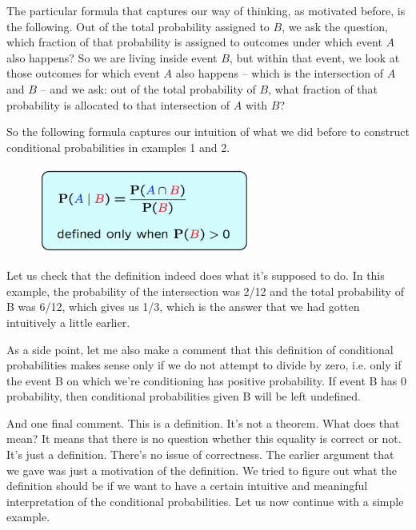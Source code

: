 \documentclass{tufte-handout}
\begin{document}
The particular formula
that captures our way of thinking, as motivated before, is the following. Out of the total probability
assigned to $B$, we ask the question, which fraction of that probability is assigned to
outcomes under which event $A$ also happens? So we are living inside event $B$, but within that event, we
look at those outcomes for which event $A$ also happens -- which is the intersection of $A$ and $B$ -- and we
ask: out of the total probability of $B$, what fraction of that probability is allocated to that intersection of $A$
with $B$?



So the following formula captures our intuition of what we did before to construct conditional
probabilities in examples 1 and 2.\begin{figure}
  \includegraphics[width=7cm]{CondDef}
\end{figure}

 Let us check that the definition indeed does what it's supposed
to do. In this example, the probability of the intersection was 2/12 and the total probability of B was
6/12, which gives us 1/3, which is the answer that we had gotten intuitively a little earlier.


As a side point, let me also make a comment that this definition of conditional probabilities makes sense
only if we do not attempt to divide by zero, i.e. only if the event B on which we're conditioning has
positive probability. If event B has 0 probability, then conditional probabilities given B will be left
undefined.

And one final comment. This is a definition. It's not a theorem. What does that mean? It means that
there is no question whether this equality is correct or not. It's just a definition. There's no issue of
correctness. The earlier argument that we gave was just a motivation of the definition. We tried to figure
out what the definition should be if we want to have a certain intuitive and meaningful interpretation of
the conditional probabilities. Let us now continue with a simple example.


\vspace{0.5cm}
\end{document}
